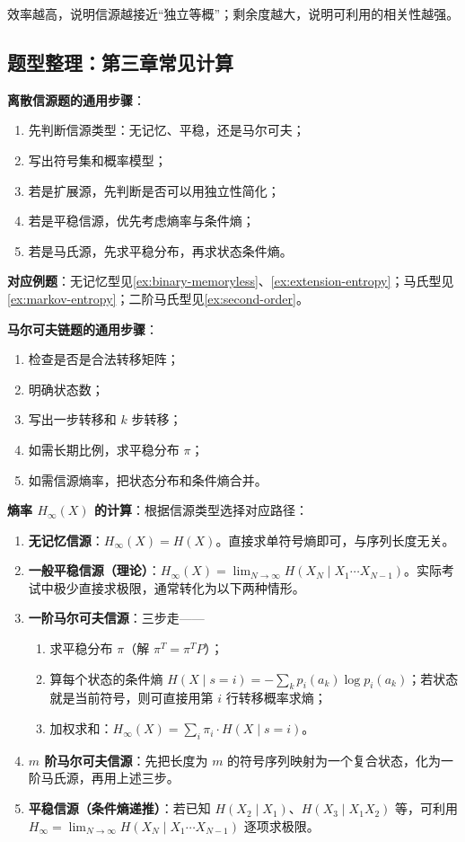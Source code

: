 效率越高，说明信源越接近“独立等概”；剩余度越大，说明可利用的相关性越强。

\subsection{题型整理：第三章常见计算}

\textbf{离散信源题的通用步骤}：
\begin{enumerate}
  \item 先判断信源类型：无记忆、平稳，还是马尔可夫；
  \item 写出符号集和概率模型；
  \item 若是扩展源，先判断是否可以用独立性简化；
  \item 若是平稳信源，优先考虑熵率与条件熵；
  \item 若是马氏源，先求平稳分布，再求状态条件熵。
\end{enumerate}
\vspace{2pt}
\noindent \textbf{对应例题}：无记忆型见\cref{ex:binary-memoryless}、\cref{ex:extension-entropy}；马氏型见\cref{ex:markov-entropy}；二阶马氏型见\cref{ex:second-order}。

\textbf{马尔可夫链题的通用步骤}：
\begin{enumerate}
  \item 检查是否是合法转移矩阵；
  \item 明确状态数；
  \item 写出一步转移和 $k$ 步转移；
  \item 如需长期比例，求平稳分布 $\pi$；
  \item 如需信源熵率，把状态分布和条件熵合并。
\end{enumerate}

\textbf{熵率 $H_\infty(X)$ 的计算}：根据信源类型选择对应路径：
\begin{enumerate}
  \item \textbf{无记忆信源}：$\displaystyle H_\infty(X)=H(X)$。直接求单符号熵即可，与序列长度无关。
  \item \textbf{一般平稳信源（理论）}：$H_\infty(X)=\lim_{N\to\infty}H(X_N\mid X_1\cdots X_{N-1})$。实际考试中极少直接求极限，通常转化为以下两种情形。
  \item \textbf{一阶马尔可夫信源}：三步走——
  \begin{enumerate}
    \item 求平稳分布 $\pi$（解 $\pi^T=\pi^T P$）；
    \item 算每个状态的条件熵 $H(X\mid s=i)=-\sum_k p_i(a_k)\log p_i(a_k)$；若状态就是当前符号，则可直接用第 $i$ 行转移概率求熵；
    \item 加权求和：$H_\infty(X)=\sum_i \pi_i\cdot H(X\mid s=i)$。
  \end{enumerate}
  \item \textbf{$m$ 阶马尔可夫信源}：先把长度为 $m$ 的符号序列映射为一个复合状态，化为一阶马氏源，再用上述三步。
  \item \textbf{平稳信源（条件熵递推）}：若已知 $H(X_2\mid X_1)$、$H(X_3\mid X_1 X_2)$ 等，可利用 $H_\infty=\lim_{N\to\infty}H(X_N\mid X_1\cdots X_{N-1})$ 逐项求极限。
\end{enumerate}

